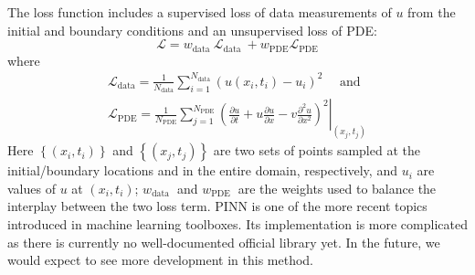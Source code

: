\documentclass[aps,prb,twocolumn,superscriptaddress,floatfix]{revtex4-2}
\begin{document}
The loss function includes a supervised loss of data measurements of $u$ from the initial and boundary conditions and an unsupervised loss of PDE:
$$
\mathcal{L}=w_{\text {data }} \mathcal{L}_{\text {data }}+w_{\mathrm{PDE}} \mathcal{L}_{\mathrm{PDE}}
$$
where
$$
\begin{gathered}
\mathcal{L}_{\mathrm{data}}=\frac{1}{N_{\mathrm{data}}} \sum_{i=1}^{N_{\mathrm{data}}}\left(u\left(x_i, t_i\right)-u_i\right)^2 \quad \text { and } \\
\mathcal{L}_{\mathrm{PDE}}=\left.\frac{1}{N_{\mathrm{PDE}}} \sum_{j=1}^{N_{\mathrm{PDE}}}\left(\frac{\partial u}{\partial t}+u \frac{\partial u}{\partial x}-v \frac{\partial^2 u}{\partial x^2}\right)^2\right|_{\left(x_j, t_j\right)}
\end{gathered}
$$
Here $\left\{\left(x_i, t_i\right)\right\}$ and $\left\{\left(x_j, t_j\right)\right\}$ are two sets of points sampled at the initial/boundary locations and in the entire domain, respectively, and $u_i$ are values of $u$ at $\left(x_i, t_i\right)$; $w_{\text {data }}$ and $w_{\text {PDE }}$ are the weights used to balance the interplay between the two loss term.
PINN is one of the more recent topics introduced in machine learning toolboxes. Its implementation is more complicated as there is currently no well-documented official library yet. In the future, we would expect to see more development in this method.
\end{document}

